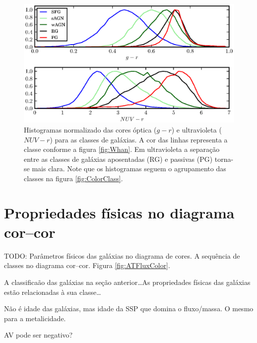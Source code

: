 \begin{figure}
	\includegraphics{figuras/histo_galtype_color.eps}
	\caption[Histogramas de cores para as classes de galáxias.]
	{Histogramas normalizado das cores óptica ($g-r$) e ultravioleta ($NUV-r$) para
	as classes de galáxias. A cor das linhas representa a classe conforme a figura
	\ref{fig:Whan}. Em ultravioleta a separação entre as classes de galáxias
	aposentadas (RG) e passivas (PG) torna-se mais clara. Note que os histogramas
	seguem o agrupamento das classes na figura \ref{fig:ColorClass}.}
	\label{fig:HistogramaCorClasse}
\end{figure}



\section{Propriedades físicas no diagrama cor--cor}

TODO: Parâmetros físicos das galáxias no diagrama de cores. A sequência de
classes no diagrama cor--cor. Figura \ref{fig:ATFluxColor}.

A classificaão das galáxias na seção anterior\ldots As propriedades físicas das
galáxias estão relacionadas à sua classe\ldots

Não é idade das galáxias, mas idade da SSP que domina o fluxo/massa. O mesmo
para a metalicidade.

AV pode ser negativo?


